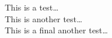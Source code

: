 \documentclass{article}
\begin{document}
This is a test\ldots\\
This is another test\ldots\\
This is a final another test\ldots\\
\end{document}
